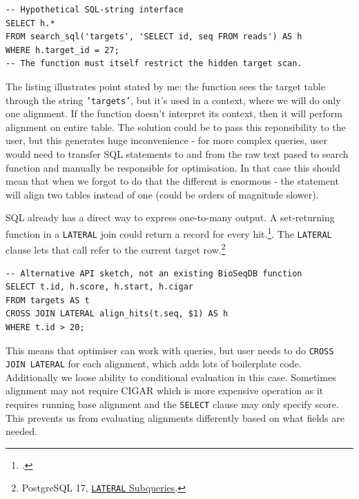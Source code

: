 \noindent\begin{minipage}{\linewidth}
\begin{lstlisting}[style=bioseq-search-sql,caption={An outer condition cannot automatically filter a hidden scan.}]
-- Hypothetical SQL-string interface
SELECT h.*
FROM search_sql('targets', 'SELECT id, seq FROM reads') AS h
WHERE h.target_id = 27;
-- The function must itself restrict the hidden target scan.
\end{lstlisting}
\end{minipage}

The listing illustrates point stated by me: the function sees the target table through the string \texttt{'targets'}, but it's used in a context, where we will do only one alignment. If the function doesn't interpret its context, then it will perform alignment on entire table.
The solution could be to pass this reponsibility to the user, but this generates huge inconvenience - for more complex queries, user would need to transfer SQL statements to and from the raw text pased to search function and manually be responsible for optimisation. In that case this should mean that
when we forgot to do that the different is enormous - the statement will align two tables instead of one (could be orders of magnitude slower).

SQL already has a direct way to express one-to-many output. A set-returning
function in a \texttt{LATERAL} join could return a record for every
hit.\footcite{postgresql17_set_returning_functions}. The \texttt{LATERAL} clause
lets that call refer to the current target row.\footnote{PostgreSQL 17,
\href{https://www.postgresql.org/docs/17/queries-table-expressions.html\#QUERIES-LATERAL}
{\texttt{LATERAL} Subqueries}.}

\noindent\begin{minipage}{\linewidth}
\begin{lstlisting}[style=bioseq-search-sql,caption={A different API could return explicit hit records.}]
-- Alternative API sketch, not an existing BioSeqDB function
SELECT t.id, h.score, h.start, h.cigar
FROM targets AS t
CROSS JOIN LATERAL align_hits(t.seq, $1) AS h
WHERE t.id > 20;
\end{lstlisting}
\end{minipage}

This means that optimiser can work with queries, but user needs to do \texttt{CROSS JOIN LATERAL} for each alignment, which adds lots of boilerplate code.
Additionally we loose ability to conditional evaluation in this case. Sometimes alignment may not require CIGAR which is more expensive operation as it requires running base alignment and the \texttt{SELECT} clause may only
specify score. This prevents us from evaluating alignments differently based on what fields are needed.

